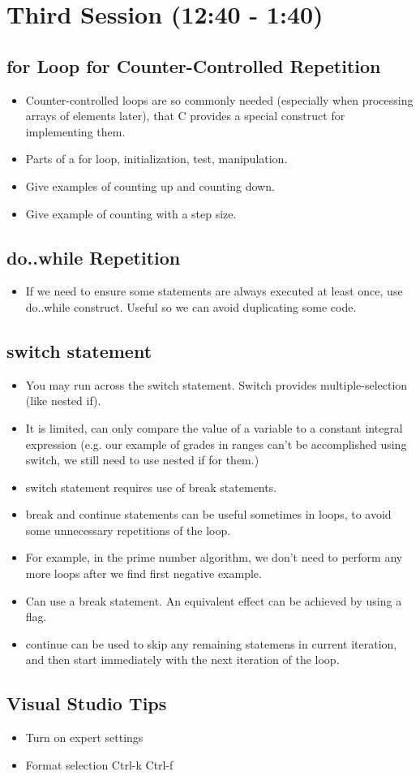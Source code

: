 \documentclass[11pt]{article}
\begin{document}
\section{Third Session (12:40 - 1:40)}
\label{sec-3}
\subsection{for Loop for Counter-Controlled Repetition}
\label{sec-3-1}

\begin{itemize}
\item Counter-controlled loops are so commonly needed (especially when
  processing arrays of elements later), that C provides a special
  construct for implementing them.
\item Parts of a for loop, initialization, test, manipulation.
\item Give examples of counting up and counting down.
\item Give example of counting with a step size.
\end{itemize}
\subsection{do..while Repetition}
\label{sec-3-2}

\begin{itemize}
\item If we need to ensure some statements are always executed at least
  once, use do..while construct.  Useful so we can avoid duplicating
  some code.
\end{itemize}
\subsection{switch statement}
\label{sec-3-3}

\begin{itemize}
\item You may run across the switch statement.  Switch provides multiple-selection (like nested if).
\item It is limited, can only compare the value of a variable to a
  constant integral expression (e.g. our example of grades in ranges
  can't be accomplished using switch, we still need to use nested if
  for them.)
\item switch statement requires use of break statements.
\item break and continue statements can be useful sometimes in loops, to
  avoid some unnecessary repetitions of the loop.
\item For example, in the prime number algorithm, we don't need to perform
  any more loops after we find first negative example.
\item Can use a break statement.  An equivalent effect can be achieved by using a flag.
\item continue can be used to skip any remaining statemens in current
  iteration, and then start immediately with the next iteration of the
  loop.
\end{itemize}
\subsection{Visual Studio Tips}
\label{sec-3-4}

\begin{itemize}
\item Turn on expert settings
\item Format selection Ctrl-k Ctrl-f
\end{itemize}
\end{document}
